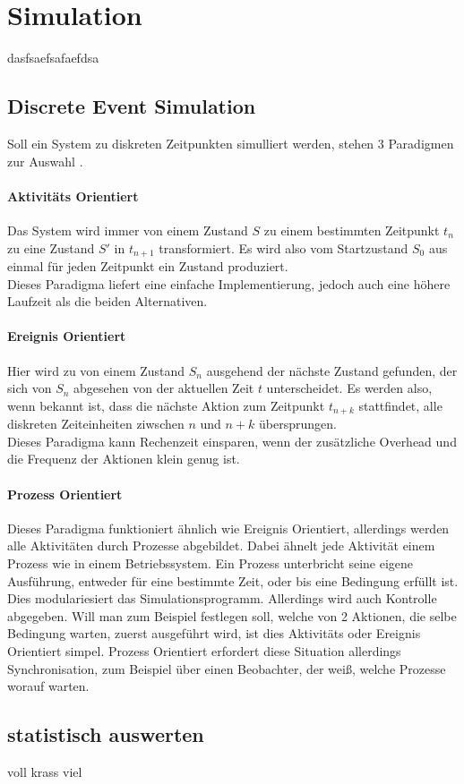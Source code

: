 \section{Simulation}

dasfsaefsafaefdsa

\subsection{Discrete Event Simulation}
Soll ein System zu diskreten Zeitpunkten simulliert werden, stehen 3 Paradigmen zur Auswahl \cite{SimPy}.
\label{paradigma}
\paragraph{Aktivitäts Orientiert}
\label{activity}
Das System wird immer von einem Zustand $S$ zu einem bestimmten Zeitpunkt $t_n$ zu eine Zustand $S'$ in $t_{n+1}$ transformiert. Es wird also vom Startzustand $S_0$ aus einmal für jeden Zeitpunkt ein Zustand produziert.\\
Dieses Paradigma liefert eine einfache Implementierung, jedoch auch eine höhere Laufzeit als die beiden Alternativen.
\paragraph{Ereignis Orientiert}
Hier wird zu von einem Zustand $S_n$ ausgehend der nächste Zustand gefunden, der sich von $S_n$ abgesehen von der aktuellen Zeit $t$ unterscheidet. Es werden also, wenn bekannt ist, dass die nächste Aktion zum Zeitpunkt $t_{n+k}$ stattfindet, alle diskreten Zeiteinheiten ziwschen $n$ und $n+k$ übersprungen.\\
Dieses Paradigma kann Rechenzeit einsparen, wenn der zusätzliche Overhead und die Frequenz der Aktionen klein genug ist.
\paragraph{Prozess Orientiert}
Dieses Paradigma funktioniert ähnlich wie Ereignis Orientiert, allerdings werden alle Aktivitäten durch Prozesse abgebildet. Dabei ähnelt jede Aktivität einem Prozess wie in einem Betriebssystem. Ein Prozess unterbricht seine eigene Ausführung, entweder für eine bestimmte Zeit, oder bis eine Bedingung erfüllt ist.\\
Dies modulariesiert das Simulationsprogramm. Allerdings wird auch Kontrolle abgegeben. Will man zum Beispiel festlegen soll, welche von 2 Aktionen, die selbe Bedingung warten, zuerst ausgeführt wird, ist dies Aktivitäts oder Ereignis Orientiert simpel. Prozess Orientiert erfordert diese Situation allerdings Synchronisation, zum Beispiel über einen Beobachter, der weiß, welche Prozesse worauf warten.



\subsection{statistisch auswerten}

voll krass viel
